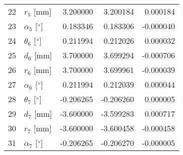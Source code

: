 \documentclass{standalone}%
\begin{document}
\begin{tabular}{llrrr}
22 &              $r_{5}$ [mm] &  3.200000 &   3.200184 &   0.000184 \\
23 &  $\alpha_{5}$ [$\degree$] &  0.183346 &   0.183306 &  -0.000040 \\
24 &  $\theta_{6}$ [$\degree$] &  0.211994 &   0.212026 &   0.000032 \\
25 &              $d_{6}$ [mm] &  3.700000 &   3.699294 &  -0.000706 \\
26 &              $r_{6}$ [mm] &  3.700000 &   3.699961 &  -0.000039 \\
27 &  $\alpha_{6}$ [$\degree$] &  0.211994 &   0.212039 &   0.000044 \\
28 &  $\theta_{7}$ [$\degree$] & -0.206265 &  -0.206260 &   0.000005 \\
29 &              $d_{7}$ [mm] & -3.600000 &  -3.599283 &   0.000717 \\
30 &              $r_{7}$ [mm] & -3.600000 &  -3.600458 &  -0.000458 \\
31 &  $\alpha_{7}$ [$\degree$] & -0.206265 &  -0.206270 &  -0.000005 \\
\bottomrule
\end{tabular}
%
\end{document}
